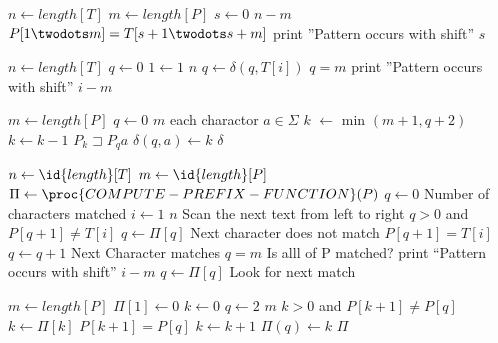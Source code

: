 \documentclass[UTF8]{ctexart}
\begin{document}
\begin{codebox}
\li $n \gets length[T]$
\li $m \gets length[P]$
\li \For $s \gets 0$ \To $n - m $
\li 	\Do \If $P[1 \twodots m ] = T[s + 1 \twodots s + m]  $
\li 		\Then print ''Pattern occurs with shift'' $s$
       \End
\end{codebox}


\begin{codebox}
\li $n \gets length[T]$
\li $q \gets 0$
\li \For $1 \gets 1$ \To $n$
\li 	\Do $q \gets \delta(q, T[i])$
\li			\If $q = m$
\li				\Then print ''Pattern occurs with shift'' $i - m$
		\End
\end{codebox}

\begin{codebox}
\li $m \gets length[P]$
\li \For $q \gets 0$ \To $m$
\li 	\Do \For each charactor $a \in \Sigma$
\li 		\Do $k$ $\gets$ min $(m + 1, q + 2)$
\li 			\Repeat $k \gets k - 1$
\li 				\Until $P_k \sqsupset P_qa$
\li 			$\delta(q, a) \gets k$
			\End
		\End
\li \Return $\delta$
\end{codebox}

\clearpage

\begin{codebox}
\li $n \gets \id{length}[T]$
\li $m \gets \id{length}[P]$
\li $\Pi \gets \proc{COMPUTE-PREFIX-FUNCTION}(P)$
\li $q \gets 0$\>\>\>\>\>\>\>\>\>\>\> \Comment Number of characters matched
\li \For $i \gets 1$ \To $n$ \>\>\>\>\>\>\>\>\>\>\> \Comment 
					Scan the next text from left to right
\li 	\Do 
			\While $q > 0$ and $P[q+1] \neq T[i]$
\li 			\Do $q \gets \Pi[q]$ \>\>\>\>\>\> \Comment Next character does not match
				\End
\li 		\If $P[q+1] = T[i]$
\li 			\Then $q \gets q + 1$ \>\>\>\>\>\>\>\Comment Next Character matches
				\End
\li 		\If $q = m$ \>\>\>\>\>\> \Comment Is alll of P matched?
\li 			\Then 
					print ``Pattern occurs with shift'' $i-m$
\li 				$q \gets \Pi[q]$ \>\>\>\>\>\> \Comment Look for next match
				\End
		\End
\end{codebox}

\begin{codebox}
\li $m \gets length[P]$
\li $\Pi[1] \gets 0$
\li $k \gets 0$
\li \For $q \gets 2$ \To $m$
\li 	\Do 
			\While $k > 0$ and $P[k+1] \neq P[q]$
\li 			\Do $k \gets \Pi[k]$
				\End
\li 			\If $P[k+1] = P[q]$
\li 				\Then $k \gets k+1$
					\End
\li 			$\Pi(q) \gets k$
			\End
		\End
\li \Return $\Pi$
\end{codebox}
\end{document}
